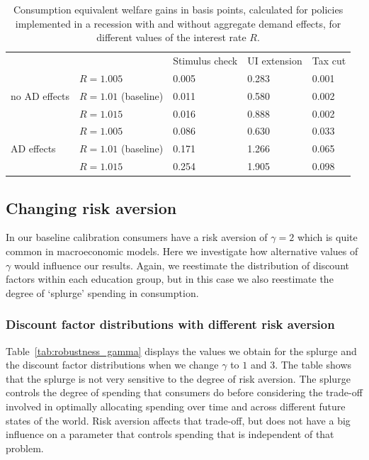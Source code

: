 \documentclass[../HAFiscal]{subfiles}
\begin{document}
\begin{table}[]
	\begin{center}
		\begin{tabular}{@{}lllll@{}}
			\toprule
			&                    & Stimulus check & UI extension & Tax cut \\ \cmidrule(l){1-5} 
			\multirow{3}{*}{no AD effects}            	& $R = 1.005$ 			& 0.005        & 0.283       & 0.001	\\
			 											& $R = 1.01$ (baseline) & 0.011        & 0.580       & 0.002   	\\
			            								& $R = 1.015$ 			& 0.016        & 0.888       & 0.002   	\\ \cmidrule(l){1-5}
			\multirow{3}{*}{AD effects}					& $R = 1.005$    		& 0.086        & 0.630       & 0.033  	\\		
														& $R = 1.01$ (baseline) & 0.171        & 1.266       & 0.065   	\\
														& $R = 1.015$    		& 0.254        & 1.905       & 0.098    \\ \cmidrule(l){1-5} 
		\end{tabular}
		\caption{Consumption equivalent welfare gains in basis points, calculated for policies implemented in a recession with and without aggregate demand effects, for different values of the interest rate $R$.}
		\label{tab:robustness_R_results}
	\end{center}
\end{table}


\FloatBarrier
\subsection{Changing risk aversion} 
\label{sec:robust_gamma} 

In our baseline calibration consumers have a risk aversion of $\gamma=2$ which is quite common in macroeconomic models. Here we investigate how alternative values of $\gamma$ would influence our results. Again, we reestimate the distribution of discount factors within each education group, but in this case we also reestimate the degree of `splurge' spending in consumption. 

\subsubsection{Discount factor distributions with different risk aversion}
\label{sec:robust_gamma_estim}

Table~\ref{tab:robustness_gamma} displays the values we obtain for the splurge and the discount factor distributions when we change $\gamma$ to $1$ and $3$. The table shows that the splurge is not very sensitive to the degree of risk aversion. The splurge controls the degree of spending that consumers do before considering the trade-off involved in optimally allocating spending over time and across different future states of the world. Risk aversion affects that trade-off, but does not have a big influence on a parameter that controls spending that is independent of that problem. 
\end{document}
